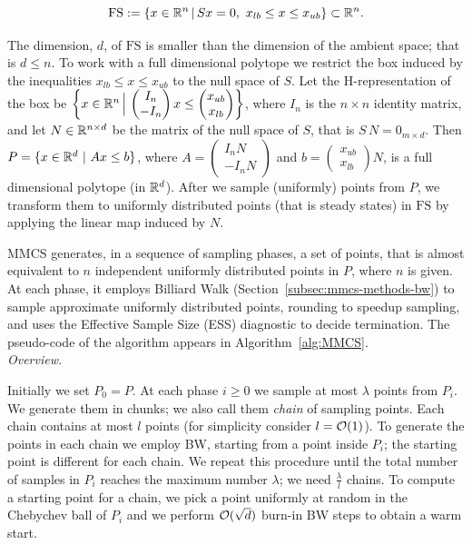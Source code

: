    \begin{equation}
   \label{eq:steady_states}
      \mathrm{FS} :=  \{x \in {\mathbb R}^n \,|\, Sx = 0,\ x_{lb}\leq x \leq x_{ub} \} \subset {\mathbb R}^n .
   \end{equation}

   The dimension, $d$, of $\mathrm{FS}$ is smaller than the dimension of the
   ambient space; that is $d \leq n$.
   To work with a full dimensional polytope we restrict the box
   induced by the inequalities $x_{lb}\leq x \leq x_{ub}$ to the null space of $S$.
   Let the  H-representation of the box be
   $\left\{ x \in {\mathbb R}^n \,\Big |\, \begin{pmatrix} I_n \\ -I_n\end{pmatrix} x
   \leq \begin{pmatrix} x_{ub} \\ x_{lb} \end{pmatrix} \right\}$,
   where $I_n$ is the $n\times n$ identity matrix,
   and let $N\in{\mathbb R}^{n\times d}$ be the matrix of the null space of $S$,
   that is $S \, N = 0_{m \times d}$.
   Then
   $P = \{ x\in{\mathbb R}^d\ |\ A x \leq b \}$,
   where $A = \begin{pmatrix} I_n N \\ -I_n N\end{pmatrix}$
   and $b = \begin{pmatrix} x_{ub} \\ x_{lb} \end{pmatrix}  N$,
   is a
   full dimensional polytope (in ${\mathbb R}^d$).
   After we sample (uniformly) points from $P$,
   we transform them to uniformly distributed points (that is steady states) in $\mathrm{FS}$
   by applying  the linear map induced by $N$.

   \vspace{8pt}
   MMCS generates, in a sequence of sampling phases, a set of points,
   that is almost equivalent to $n$ independent uniformly distributed points in $P$, where $n$ is given.
   At each phase, it employs Billiard Walk (Section~\ref{subsec:mmcs-methods-bw}) 
   to sample approximate uniformly distributed points, rounding
   to speedup sampling,
   and uses the Effective Sample Size (ESS) diagnostic to decide termination.
   The pseudo-code of the algorithm appears in Algorithm~\ref{alg:MMCS}. \\


   \emph{Overview.} 
   
   Initially we set $P_0 = P$.
   At each phase $i \geq 0$ we sample at most $\lambda$ points from $P_i$. We
   generate them in chunks; we also call them  \emph{chain} of sampling points.
   Each chain contains at  most $l$ points (for simplicity consider $l = \mathcal{O}(1)$). To
   generate the points in each chain we employ BW, starting from a point inside
   $P_i$; the starting point is different for each chain.
   We repeat this procedure until the total number of samples in $P_i$ reaches the maximum number $\lambda$; we need $\tfrac{\lambda}{l}$ chains.
   To compute a starting point for a chain, we pick a point uniformly at random in the
   Chebychev ball of $P_i$ and we perform $\mathcal{O}(\sqrt{d})$
   burn-in BW steps to obtain a warm start.

